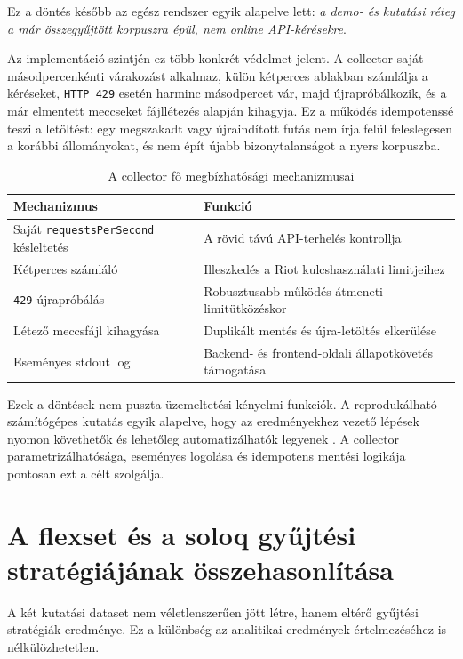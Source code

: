 ﻿\documentclass[a4paper,12pt]{report}
\begin{document}
Ez a döntés később az egész rendszer egyik alapelve lett: \emph{a demo- és kutatási réteg a már összegyűjtött korpuszra épül, nem online API-kérésekre}.

Az implementáció szintjén ez több konkrét védelmet jelent. A collector saját másodpercenkénti várakozást alkalmaz, külön kétperces ablakban számlálja a kéréseket, \texttt{HTTP 429} esetén harminc másodpercet vár, majd újrapróbálkozik, és a már elmentett meccseket fájllétezés alapján kihagyja. Ez a működés idempotenssé teszi a letöltést: egy megszakadt vagy újraindított futás nem írja felül feleslegesen a korábbi állományokat, és nem épít újabb bizonytalanságot a nyers korpuszba.

\begin{table}[H]
\centering
\caption{A collector fő megbízhatósági mechanizmusai}
\begin{tabularx}{\textwidth}{>{\raggedright\arraybackslash}p{4.4cm}X}
\toprule
\textbf{Mechanizmus} & \textbf{Funkció} \\
\midrule
Saját \texttt{requestsPerSecond} késleltetés & A rövid távú API-terhelés kontrollja \\
Kétperces számláló & Illeszkedés a Riot kulcshasználati limitjeihez \\
\texttt{429} újrapróbálás & Robusztusabb működés átmeneti limitütközéskor \\
Létező meccsfájl kihagyása & Duplikált mentés és újra-letöltés elkerülése \\
Eseményes stdout log & Backend- és frontend-oldali állapotkövetés támogatása \\
\bottomrule
\end{tabularx}
\end{table}

Ezek a döntések nem puszta üzemeltetési kényelmi funkciók. A reprodukálható számítógépes kutatás egyik alapelve, hogy az eredményekhez vezető lépések nyomon követhetők és lehetőleg automatizálhatók legyenek \cite{sandve2013}. A collector parametrizálhatósága, eseményes logolása és idempotens mentési logikája pontosan ezt a célt szolgálja.

\section{A flexset és a soloq gyűjtési stratégiájának összehasonlítása}

A két kutatási dataset nem véletlenszerűen jött létre, hanem eltérő gyűjtési stratégiák eredménye. Ez a különbség az analitikai eredmények értelmezéséhez is nélkülözhetetlen.
\end{document}
